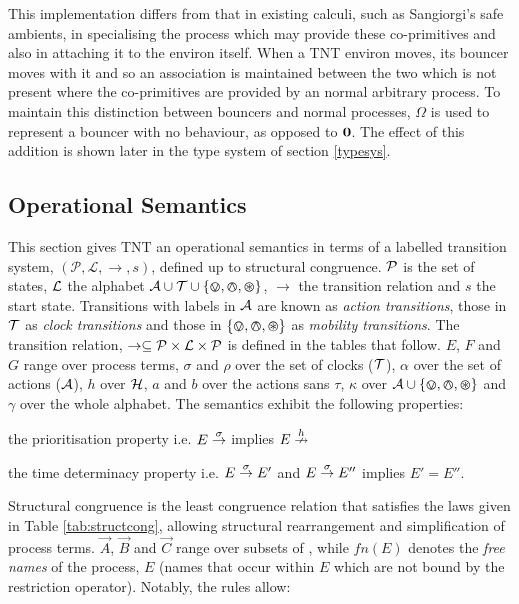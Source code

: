 \documentclass[orivec,envcountsame]{llncs}
\begin{document}
This implementation differs from that in existing calculi, such as
Sangiorgi's safe ambients, in specialising the process which may provide
these co-primitives and also in attaching it to the environ itself.
When a TNT environ moves, its bouncer moves with it and so an
association is maintained between the two which is not present where the
co-primitives are provided by an normal arbitrary process.  To maintain
this distinction between bouncers and normal processes, $\Omega$ is used
to represent a bouncer with no behaviour, as opposed to $\textbf{0}$.  The
effect of this addition is shown later in the type system of section
\ref{typesys}.

\subsection{Operational Semantics}

This section gives TNT an operational semantics in terms of a labelled
transition system, $(\mathcal{P}, \mathcal{L}, \rightarrow, s)$, defined
up to structural congruence.  $\text{$\mathcal{P}$}$ is the set of states, $\text{$\mathcal{L}$}$ the
alphabet $\text{$\mathcal{A}$} \cup \text{$\mathcal{T}$} \cup \text{$\{ \varovee, \varowedge , \varoast\}$}$, $\rightarrow$ the
transition relation and $s$ the start state.  Transitions with labels in
$\text{$\mathcal{A}$}$ are known as \emph{action transitions}, those in $\text{$\mathcal{T}$}$ as
\emph{clock transitions} and those in $\text{$\{ \varovee, \varowedge , \varoast\}$}$ as \emph{mobility
transitions}.  The transition relation, $\rightarrow \subseteq
\text{$\mathcal{P}$} \times \text{$\mathcal{L}$} \times \text{$\mathcal{P}$}$ is defined in the tables that follow.
$E$, $F$ and $G$ range over process terms, $\sigma$ and $\rho$ over the
set of clocks ($\text{$\mathcal{T}$}$), $\alpha$ over the set of actions
($\text{$\mathcal{A}$}$), $h$ over $\text{$\mathcal{H}$}$, $a$ and $b$ over the actions
sans $\tau$, $\kappa$ over $\text{$\mathcal{A}$} \cup \text{$\{ \varovee, \varowedge , \varoast\}$}$
and $\gamma$ over the whole alphabet.  The semantics exhibit the
following properties:
\begin{proposition}
the prioritisation property
i.e. $E \stackrel{\sigma}{\rightarrow}$ implies $E \stackrel{h}{\nrightarrow}$ 
\end{proposition}
\begin{proposition}
the time determinacy property i.e. $E \stackrel{\sigma}{\rightarrow} E'$ and $E
\stackrel{\sigma}{\rightarrow} E''$ implies $E' = E''$.
\end{proposition}
Structural congruence is the least congruence relation that satisfies
the laws given in Table \ref{tab:structcong}, allowing structural
rearrangement and simplification of process terms. $\vec{A}$, $\vec{B}$
and $\vec{C}$ range over subsets of \actions, while $fn(E)$ denotes the
\emph{free names} of the process, $E$ (names that occur within $E$ which
are not bound by the restriction operator).  Notably, the rules allow:
 
\end{document}
